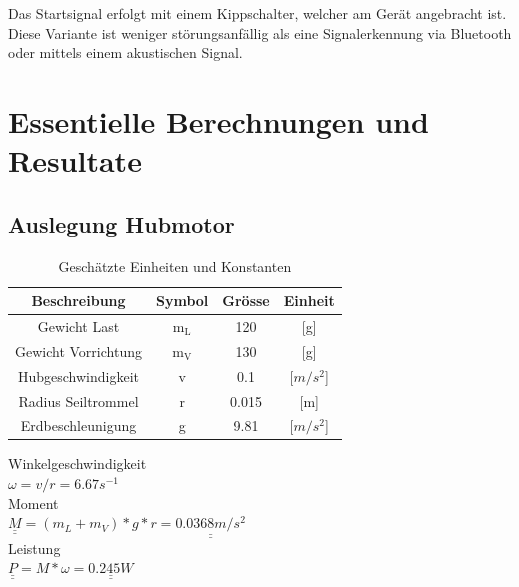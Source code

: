 \documentclass[a4paper]{report}
\begin{document}
Das Startsignal erfolgt mit einem Kippschalter, welcher am Gerät angebracht ist. Diese Variante ist weniger störungsanfällig als eine Signalerkennung via Bluetooth oder mittels einem akustischen Signal.


\section{Essentielle Berechnungen und Resultate}
\label{sec:EssBerechnung}
\subsection{Auslegung Hubmotor}
\begin{table}[h!]
	\centering
	\begin{tabular}{|c|c|c|c|}
		\hline
		\textbf{Beschreibung}& \textbf{Symbol} & \textbf{Grösse} & \textbf{Einheit} \\
		\hline
		Gewicht Last& m$_{\text{L}}$ & 120 & [g] \\
		\hline
		Gewicht Vorrichtung& m$_{\text{V}}$ & 130 & [g] \\
		\hline
		Hubgeschwindigkeit& v & 0.1 & [$m/s^2$] \\
		\hline
		Radius Seiltrommel & r & 0.015 & [m]\\
		\hline
		Erdbeschleunigung & g & 9.81 & [$m/s^2$]\\
		\hline
	\end{tabular}
	\caption{Geschätzte Einheiten und Konstanten}
\end{table}
\noindent
Winkelgeschwindigkeit\\
$\omega=v/r=6.67s^{-1}$	\\
Moment\\
$\underline{\underline{M}}=(m_L+m_V)*g*r=\underline{\underline{0.0368m/s^2}}$\\
Leistung	\\
$\underline{\underline{P}}=M*\omega=\underline{\underline{0.245W}}$
\end{document}
